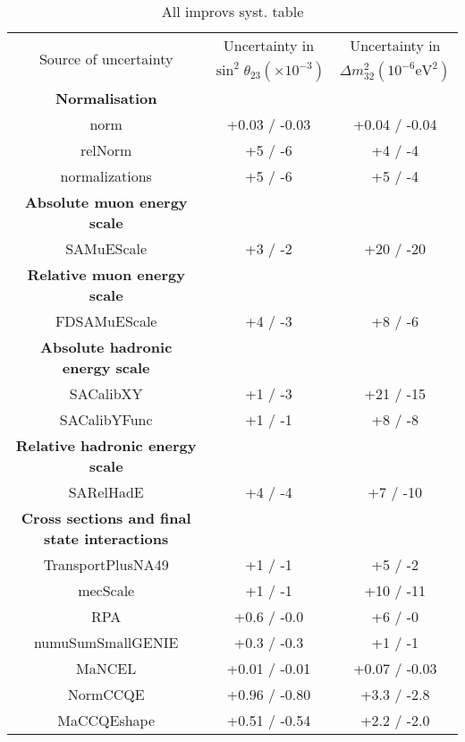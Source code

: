 \begin{table*}[t]
  \centering
  \caption{
    All improvs syst. table
  }
  \begin{tabular}{c c c}
    \hline 
    \multirow{2}{*}{Source of uncertainty} & 
                                             Uncertainty in & 
                                                              Uncertainty in \\
                                           & $\sin^2\!\theta_{23}
                                             (\times 10^{-3})$ & 
                                                                 $\Delta
                                                                 m^2_{32}
                                                                 \left(10^{-6}\text{
                                                                 eV}^{2}\right)$\\
    \hline 
    \textbf{Normalisation} & & \\
    norm& +0.03 / -0.03& +0.04 / -0.04 \\
    relNorm& +5 / -6 & +4 / -4 \\
    normalizations& +5 / -6& +5 / -4 \\
    \hline
    \textbf{Absolute muon energy scale} & & \\
    SAMuEScale& +3 / -2& +20 / -20 \\
    \textbf{Relative muon energy scale} & & \\
    FDSAMuEScale& +4 / -3& +8 / -6 \\
    \textbf{Absolute hadronic energy scale} & & \\
    SACalibXY& +1 / -3& +21 / -15 \\
    SACalibYFunc& +1 / -1& +8 / -8 \\
    \textbf{Relative hadronic energy scale} & & \\
    SARelHadE& +4 / -4& +7 / -10 \\
    \hline
    \textbf{Cross sections and final state interactions} & & \\
    TransportPlusNA49& +1 / -1& +5 / -2 \\
    mecScale& +1 / -1& +10 / -11 \\
    RPA& +0.6 / -0.0 & +6 / -0 \\
    numuSumSmallGENIE& +0.3 / -0.3& +1 / -1 \\
    MaNCEL& +0.01 / -0.01& +0.07 / -0.03 \\
    NormCCQE& +0.96 / -0.80& +3.3 / -2.8 \\
    MaCCQEshape& +0.51 / -0.54& +2.2 / -2.0 \\

\end{tabular}
\end{table*}

